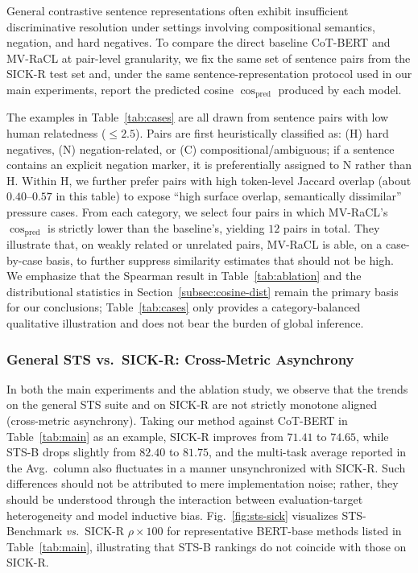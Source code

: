 \documentclass[a4paper,fleqn]{cas-dc}
\begin{document}
General contrastive sentence representations often exhibit insufficient discriminative resolution under settings involving compositional semantics, negation, and hard negatives. To compare the direct baseline CoT-BERT and MV-RaCL at pair-level granularity, we fix the same set of sentence pairs from the SICK-R test set and, under the same sentence-representation protocol used in our main experiments, report the predicted cosine $\cos_{\mathrm{pred}}$ produced by each model.

The examples in Table~\ref{tab:cases} are all drawn from sentence pairs with low human relatedness ($\leq 2.5$). Pairs are first heuristically classified as: (H) hard negatives, (N) negation-related, or (C) compositional/ambiguous; if a sentence contains an explicit negation marker, it is preferentially assigned to N rather than H. Within H, we further prefer pairs with high token-level Jaccard overlap (about $0.40$--$0.57$ in this table) to expose ``high surface overlap, semantically dissimilar'' pressure cases. From each category, we select four pairs in which MV-RaCL's $\cos_{\mathrm{pred}}$ is strictly lower than the baseline's, yielding $12$ pairs in total. They illustrate that, on weakly related or unrelated pairs, MV-RaCL is able, on a case-by-case basis, to further suppress similarity estimates that should not be high. We emphasize that the Spearman result in Table~\ref{tab:ablation} and the distributional statistics in Section~\ref{subsec:cosine-dist} remain the primary basis for our conclusions; Table~\ref{tab:cases} only provides a category-balanced qualitative illustration and does not bear the burden of global inference.

\subsubsection{General STS vs.\ SICK-R: Cross-Metric Asynchrony}

In both the main experiments and the ablation study, we observe that the trends on the general STS suite and on SICK-R are not strictly monotone aligned (cross-metric asynchrony). Taking our method against CoT-BERT in Table~\ref{tab:main} as an example, SICK-R improves from $71.41$ to $74.65$, while STS-B drops slightly from $82.40$ to $81.75$, and the multi-task average reported in the Avg.\ column also fluctuates in a manner unsynchronized with SICK-R. Such differences should not be attributed to mere implementation noise; rather, they should be understood through the interaction between evaluation-target heterogeneity and model inductive bias. Fig.~\ref{fig:sts-sick} visualizes STS-Benchmark \emph{vs.}\ SICK-R $\rho{\times}100$ for representative BERT-base methods listed in Table~\ref{tab:main}, illustrating that STS-B rankings do not coincide with those on SICK-R.
\end{document}
